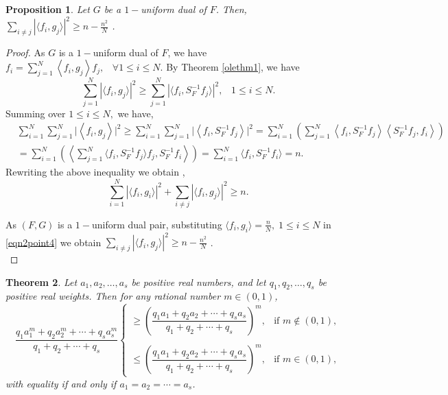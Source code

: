 \documentclass[final,1p,times]{elsarticle}
\newtheorem{thm}{Theorem}[section]
\newtheorem{prop}[thm]{Proposition}
\begin{document}
  \begin{prop}\label{}
  Let $G $ be a $1-$uniform dual of $F$. Then,
  $\sum\limits_{i \neq j} | \langle f_i , g_j \rangle |^2 \geq n- \frac{n^2}{N}$ . 
 
  \end{prop}
 \begin{proof}
   As $G$ is a $1-$uniform dual of $F$, we have $f_i= \sum\limits_{j=1}^N \left\langle f_i , g_j \right\rangle f_{j} ,\;\;\;\forall 1\leq i \leq N.$
   By Theorem \ref{olethm1}, we have
   $$ \sum_{j=1}^N |\langle f_i , g_j \rangle|^2 \geq \sum_{j=1}^N |\langle f_i , S_F^{-1}f_j \rangle|^2 ,\;\;\; 1 \leq i \leq N .$$
   Summing over $1 \leq i \leq N,$ we have,  
\begin{align} \label{eqn2point3}
& \sum_{i=1}^N \sum_{j=1}^N \bigg|\left\langle f_i , g_j \right\rangle \bigg|^2 \geq  \sum_{i=1}^N\sum_{j=1}^N \bigg|\left\langle f_i , S_F^{-1}f_j \right\rangle \bigg|^2   =  \sum_{i=1}^N\left( \sum_{j=1}^N \left\langle f_i , S_F^{-1}f_j \right\rangle \left\langle S_F^{-1}f_j , f_i  \right\rangle \right)\nonumber \\&= \sum_{i=1}^N\left( \left\langle  \sum_{j=1}^N \langle f_i , S_F^{-1}f_j \rangle f_j , S_F^{-1}f_i \right\rangle  \right)  = \sum_{i=1}^N \langle f_i , S_F^{-1}f_i \rangle  = n.
\end{align} 
 Rewriting the above inequality we obtain ,
\begin{equation}\label{eqn2point4}
\sum_{i=1}^N |\langle f_i , g_i \rangle |^2 + \sum_{i \neq j} |\langle f_i , g_j \rangle |^2 \geq n . 
\end{equation} 

 As $(F,G)$ is a $1-$uniform dual pair,  substituting $\langle f_i, g_i \rangle  = \frac{n}{N},\;1\leq i \leq N $ in \eqref{eqn2point4}
we obtain  $\sum\limits_{i \neq j} | \langle f_i , g_j \rangle |^2 \geq n- \frac{n^2}{N}$ .\\


  \end{proof} 





\begin{thm}\label{lemma2point4}\cite{mondal}
Let \( a_1, a_2, \ldots, a_s \) be positive real numbers, and let \( q_1, q_2, \ldots, q_s \) be positive real weights. Then for any rational number \( m \in (0,1) \), 
\[
\frac{q_1 a_1^m + q_2 a_2^m + \cdots + q_s a_s^m}{q_1 + q_2 + \cdots + q_s}
\begin{cases}
\geq \left( \dfrac{q_1 a_1 + q_2 a_2 + \cdots + q_s a_s}{q_1 + q_2 + \cdots + q_s} \right)^m, & \text{if } m \notin (0,1), \\~\\
\leq \left( \dfrac{q_1 a_1 + q_2 a_2 + \cdots + q_s a_s}{q_1 + q_2 + \cdots + q_s} \right)^m, & \text{if } m \in (0,1),
\end{cases}
\]
with equality if and only if \( a_1 = a_2 = \cdots = a_s \).
\end{thm}
\end{document}
